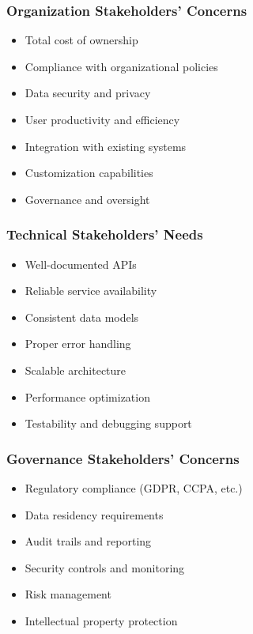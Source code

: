 \subsubsection*{Organization Stakeholders' Concerns}
\begin{itemize}
   \item Total cost of ownership
   \item Compliance with organizational policies
   \item Data security and privacy
   \item User productivity and efficiency
   \item Integration with existing systems
   \item Customization capabilities
   \item Governance and oversight
\end{itemize}

\subsubsection*{Technical Stakeholders' Needs}
\begin{itemize}
   \item Well-documented APIs
   \item Reliable service availability
   \item Consistent data models
   \item Proper error handling
   \item Scalable architecture
   \item Performance optimization
   \item Testability and debugging support
\end{itemize}

\subsubsection*{Governance Stakeholders' Concerns}
\begin{itemize}
   \item Regulatory compliance (GDPR, CCPA, etc.)
   \item Data residency requirements
   \item Audit trails and reporting
   \item Security controls and monitoring
   \item Risk management
   \item Intellectual property protection
\end{itemize}

